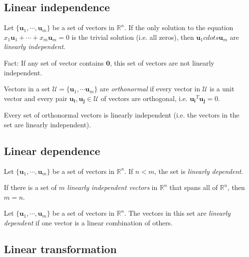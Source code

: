 \subsection{Linear independence}
\begin{definition}
Let $\{\bm{u}_1,\cdots,\bm{u}_m\}$ be a set of vectors in $\mathbb{R}^n$. If the only solution to the equation $x_1\bm{u}_1+\cdots+x_m\bm{u}_m=0$ is the trivial solution (i.e. all zeros), then $\bm{u}_1cdots\bm{u}_m$ are \emph{linearly independent}.
\end{definition}
Fact: If any set of vector contains $\bm{0}$, this set of vectors are not linearly independent.

\begin{definition}
Vectors in a set $\mathcal{U}=\{\bm{u}_1,\cdots\bm{u}_m\}$ are \emph{orthonormal} if every vector in $\mathcal{U}$ is a unit vector and every pair $\bm{u_i},\bm{u_j}\in\mathcal{U}$ of vectors are orthogonal, i.e. $\bm{u_i}^T\bm{u_j}=0$.
\end{definition}

\begin{theorem}
Every set of orthonormal vectors is linearly independent (i.e. the vectors in the set are linearly independent).
\end{theorem}

\subsection{Linear dependence}
\begin{theorem}
Let $\{\bm{u}_1,\cdots,\bm{u}_m\}$ be a set of vectors in $\mathbb{R}^n$. If $n<m$, the set is \emph{linearly dependent}.
\end{theorem}

\begin{corollary}
If there is a set of $m$ \emph{linearly independent vectors} in $\mathbb{R}^n$ that spans all of $\mathbb{R}^n$, then $m=n$.
\end{corollary}

\begin{theorem}
Let $\{\bm{u}_1,\cdots,\bm{u}_m\}$ be a set of vectors in $\mathbb{R}^n$. The vectors in this set are \emph{linearly dependent} if one vector is a linear combination of others.
\end{theorem}

\subsection{Linear transformation}

